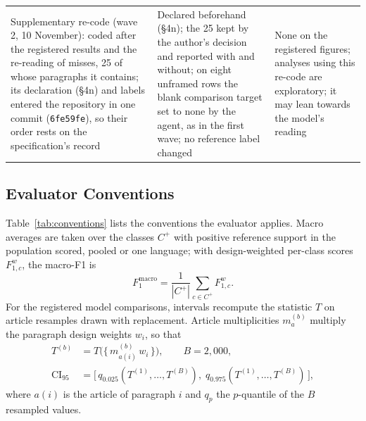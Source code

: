 \begin{longtable}{@{}>{\raggedright\arraybackslash}p{36mm}>{\raggedright\arraybackslash}p{64mm}>{\raggedright\arraybackslash}p{52mm}@{}}
Supplementary re-code (wave 2, 10 November): coded after the registered results and the re-reading of misses, 25 of whose paragraphs it contains; its declaration (\S4n) and labels entered the repository in one commit (\texttt{6fe59fe}), so their order rests on the specification's record & Declared beforehand (\S4n); the 25 kept by the author's decision and reported with and without; on eight unframed rows the blank comparison target set to none by the agent, as in the first wave; no reference label changed & None on the registered figures; analyses using this re-code are exploratory; it may lean towards the model's reading \\
\end{longtable}
\endgroup

\subsection{Evaluator Conventions}\label{app:evaluator_conventions}

Table~\ref{tab:conventions} lists the conventions the evaluator applies. Macro averages are taken over the classes $C^{+}$ with positive reference support in the population scored, pooled or one language; with design-weighted per-class scores $F_{1,c}^{w}$, the macro-F1 is
\begin{equation}
F_1^{\mathrm{macro}} = \frac{1}{|C^{+}|} \sum_{c \in C^{+}} F_{1,c}^{w}.
\label{eq:macrof1}
\end{equation}
For the registered model comparisons, intervals recompute the statistic $T$ on article resamples drawn with replacement. Article multiplicities $m_a^{(b)}$ multiply the paragraph design weights $w_i$, so that
\begin{equation}
\begin{aligned}
T^{(b)} &= T\bigl(\{\,m_{a(i)}^{(b)}\, w_i\,\}\bigr), \qquad B = 2{,}000, \\
\mathrm{CI}_{95} &= \bigl[\,q_{0.025}(T^{(1)}, \dots, T^{(B)}),\; q_{0.975}(T^{(1)}, \dots, T^{(B)})\,\bigr],
\end{aligned}
\label{eq:resample}
\end{equation}
where $a(i)$ is the article of paragraph $i$ and $q_p$ the $p$-quantile of the $B$ resampled values.

